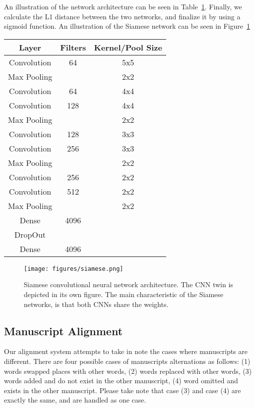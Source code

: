 \documentclass[10pt, a4paper, conference, compsocconf]{IEEEtran}
\begin{document}
An illustration of the network architecture can be seen in Table~\ref{table:network}. Finally, we calculate the L1 distance between the two networks, and finalize it by using a sigmoid function. An illustration of the Siamese network can be seen in Figure~\ref{figure:siamese}\begin{table}
	\centering
	\begin{tabular}{| c | c | c |}
		\hline
		Layer & Filters & Kernel/Pool Size \\ \hline
		Convolution & 64 & 5x5  \\ \hline
		Max Pooling & & 2x2  \\ \hline
		Convolution & 64 & 4x4 \\ \hline
		Convolution & 128 & 4x4  \\ \hline
		Max Pooling & & 2x2  \\ \hline		
		Convolution & 128 & 3x3  \\ \hline
		Convolution & 256 & 3x3  \\ \hline
		Max Pooling & & 2x2  \\ \hline		
		Convolution & 256 & 2x2  \\ \hline
		Convolution & 512 & 2x2  \\ \hline
		Max Pooling & & 2x2  \\ \hline		
		Dense & 4096 & \\ \hline
		DropOut & &  \\ \hline
		Dense & 4096 & \\ \hline
	\end{tabular}
\label{table:network}
\end{table}\begin{figure}
	\texttt{[image: figures/siamese.png]}
	\caption{Siamese convolutional neural network architecture. The CNN twin is depicted in its own figure. The main characteristic of the Siamese networks, is that both CNNs share the weights.}
	\label{figure:siamese}
\end{figure}\subsection{Manuscript Alignment}

Our alignment system attempts to take in note the cases where manuscripts are different. There are four possible cases of manuscripts alternations as follows: (1) words swapped places with other words, (2) words replaced with other words, (3) words added and do not exist in the other manuscript, (4) word omitted and exists in the other manuscript. Please take note that case (3) and case (4) are exactly the same, and are handled as one case.
\end{document}
